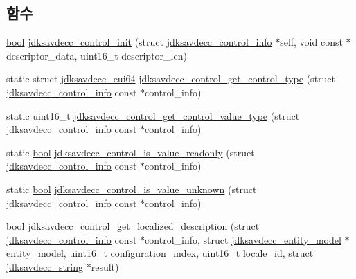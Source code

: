 \subsection*{함수}
\begin{DoxyCompactItemize}
\item 
\hyperlink{avb__gptp_8h_af6a258d8f3ee5206d682d799316314b1}{bool} \hyperlink{group__aem__control__value__helpers_gadf186b4e0e60875faf661cfd11a44bfa}{jdksavdecc\+\_\+control\+\_\+init} (struct \hyperlink{structjdksavdecc__control__info}{jdksavdecc\+\_\+control\+\_\+info} $\ast$self, void const $\ast$descriptor\+\_\+data, uint16\+\_\+t descriptor\+\_\+len)
\item 
static struct \hyperlink{structjdksavdecc__eui64}{jdksavdecc\+\_\+eui64} \hyperlink{group__aem__control__value__helpers_gab8a49673aec029f9e2c3b56b7f764ab6}{jdksavdecc\+\_\+control\+\_\+get\+\_\+control\+\_\+type} (struct \hyperlink{structjdksavdecc__control__info}{jdksavdecc\+\_\+control\+\_\+info} const $\ast$control\+\_\+info)
\item 
static uint16\+\_\+t \hyperlink{group__aem__control__value__helpers_gaf9e9a415c6cd7272b7888929fab0f0c0}{jdksavdecc\+\_\+control\+\_\+get\+\_\+control\+\_\+value\+\_\+type} (struct \hyperlink{structjdksavdecc__control__info}{jdksavdecc\+\_\+control\+\_\+info} const $\ast$control\+\_\+info)
\item 
static \hyperlink{avb__gptp_8h_af6a258d8f3ee5206d682d799316314b1}{bool} \hyperlink{group__aem__control__value__helpers_gaddd544adef7d55eddc18792c8688d4de}{jdksavdecc\+\_\+control\+\_\+is\+\_\+value\+\_\+readonly} (struct \hyperlink{structjdksavdecc__control__info}{jdksavdecc\+\_\+control\+\_\+info} const $\ast$control\+\_\+info)
\item 
static \hyperlink{avb__gptp_8h_af6a258d8f3ee5206d682d799316314b1}{bool} \hyperlink{group__aem__control__value__helpers_ga34258264f94d016439632ed96c5a58a6}{jdksavdecc\+\_\+control\+\_\+is\+\_\+value\+\_\+unknown} (struct \hyperlink{structjdksavdecc__control__info}{jdksavdecc\+\_\+control\+\_\+info} const $\ast$control\+\_\+info)
\item 
\hyperlink{avb__gptp_8h_af6a258d8f3ee5206d682d799316314b1}{bool} \hyperlink{group__aem__control__value__helpers_gadced5389d762e56ce350d5a1bf2e9d0d}{jdksavdecc\+\_\+control\+\_\+get\+\_\+localized\+\_\+description} (struct \hyperlink{structjdksavdecc__control__info}{jdksavdecc\+\_\+control\+\_\+info} const $\ast$control\+\_\+info, struct \hyperlink{structjdksavdecc__entity__model}{jdksavdecc\+\_\+entity\+\_\+model} $\ast$entity\+\_\+model, uint16\+\_\+t configuration\+\_\+index, uint16\+\_\+t locale\+\_\+id, struct \hyperlink{structjdksavdecc__string}{jdksavdecc\+\_\+string} $\ast$result)

\end{DoxyCompactItemize}
